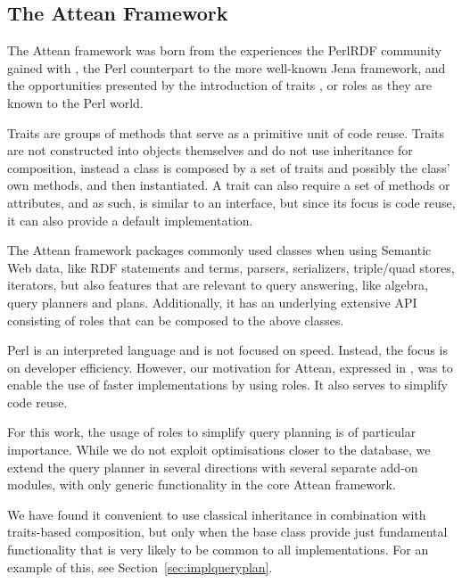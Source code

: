 \subsection{The Attean Framework}\label{sec:attean}

The Attean framework was born from the experiences the PerlRDF
community gained with , the Perl counterpart to
the more well-known Jena framework, and the opportunities presented by
the introduction of traits \cite{traits}, or roles as they are known
to the Perl world.

Traits are groups of methods that serve as a primitive unit of code
reuse. Traits are not constructed into objects themselves and do not
use inheritance for composition, instead a class is composed by a set
of traits and possibly the class' own methods, and then
instantiated. A trait can also require a set of methods or attributes,
and as such, is similar to an interface, but since its focus is code
reuse, it can also provide a default implementation.

The Attean framework packages commonly used classes when using
Semantic Web data, like RDF statements and terms, parsers,
serializers, triple/quad stores, iterators, but also features that are
relevant to query answering, like algebra, query planners and
plans. Additionally, it has an underlying extensive API consisting of
roles that can be composed to the above classes.

Perl is an interpreted language and is not focused on speed. Instead,
the focus is on developer efficiency. However, our motivation for
Attean, expressed in \cite{williamspushing}, was to enable the use
of faster implementations by using roles. It also serves to simplify 
code reuse.

For this work, the usage of roles to simplify query planning is of
particular importance. While we do not exploit optimisations closer to
the database, we extend the query planner in several directions with
several separate add-on modules, with only generic functionality in
the core Attean framework.

We have found it convenient to use classical inheritance in
combination with traits-based composition, but only when the base
class provide just fundamental functionality that is very likely to be
common to all implementations. For an example of this, see
Section~\ref{sec:implqueryplan}.

